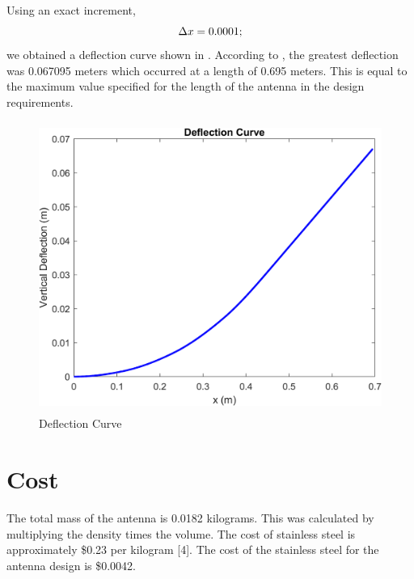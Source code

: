 \documentclass[12pt]{article}
\begin{document}
Using an exact increment, 
\begin{equation}
    \centering
    \Delta{x} = 0.0001;
\end{equation}
we obtained a deflection curve shown in . According to , the greatest deflection was 0.067095 meters which occurred at a length of 0.695 meters. This is equal to the maximum value specified for the length of the antenna in the design requirements.

\begin{figure}[H]
\centering
\includegraphics[height= 9.5cm, width= 12.5cm]{curve_Deflection_Curve.png}
\caption{Deflection Curve}
\label{Figure 7}
\end{figure}
\newpage

\section{Cost}
The total mass of the antenna is 0.0182 kilograms. This was calculated by multiplying the density times the volume. The cost of stainless steel is approximately \$0.23 per kilogram [4]. The cost of the stainless steel for the antenna design is \$0.0042.
\newpage
\end{document}
